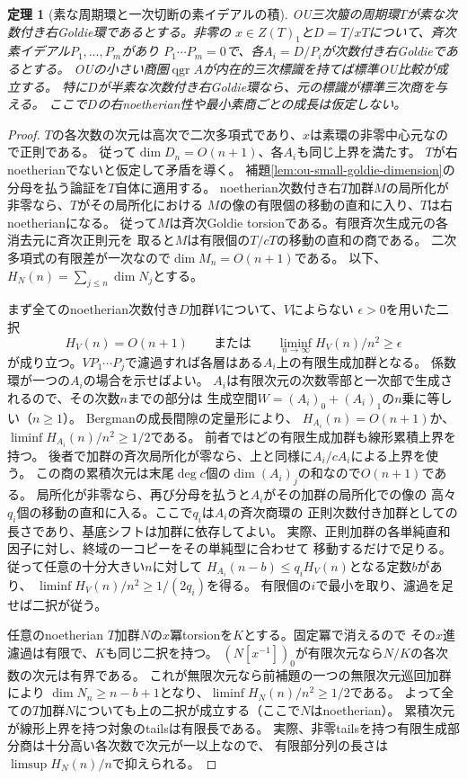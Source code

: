 \documentclass[11pt,a4paper]{ltjsarticle}
\newtheorem{theorem}{定理}[section]
\theoremstyle{definition}
\newcommand{\qgr}{\operatorname{qgr}}
\begin{document}
\begin{theorem}[素な周期環と一次切断の素イデアルの積]
\label{thm:ou-literal-filtered-window-cut}
OU三次箙の周期環$T$が素な次数付き右Goldie環であるとする。非零の
$x\in Z(T)_1$と$D=T/xT$について、斉次素イデアル$P_1,\ldots,P_m$があり
$P_1\cdots P_m=0$で、各$A_i=D/P_i$が次数付き右Goldieであるとする。
OUの小さい商圏$\qgr A$が内在的三次標識を持てば標準OU比較が成立する。
特に$D$が半素な次数付き右Goldie環なら、元の標識が標準三次商を与える。
ここで$D$の右noetherian性や最小素商ごとの成長は仮定しない。
\end{theorem}
\begin{proof}
$T$の各次数の次元は高次で二次多項式であり、$x$は素環の非零中心元なので正則である。
従って$\dim D_n=O(n+1)$、各$A_i$も同じ上界を満たす。
$T$が右noetherianでないと仮定して矛盾を導く。
補題\ref{lem:ou-small-goldie-dimension}の分母を払う論証を$T$自体に適用する。
noetherian次数付き右$T$加群$M$の局所化が非零なら、$T$がその局所化における
$M$の像の有限個の移動の直和に入り、$T$は右noetherianになる。
従って$M$は斉次Goldie torsionである。有限斉次生成元の各消去元に斉次正則元を
取ると$M$は有限個の$T/cT$の移動の直和の商である。
二次多項式の有限差が一次なので$\dim M_n=O(n+1)$である。
以下、$H_N(n)=\sum_{j\le n}\dim N_j$とする。

まず全てのnoetherian次数付き$D$加群$V$について、$V$によらない
$\epsilon>0$を用いた二択
\[
 H_V(n)=O(n+1)\qquad\text{または}\qquad
 \liminf_{n\to\infty}H_V(n)/n^2\ge\epsilon
\]
が成り立つ。$VP_1\cdots P_j$で濾過すれば各層はある$A_i$上の有限生成加群となる。
係数環が一つの$A_i$の場合を示せばよい。
$A_i$は有限次元の次数零部と一次部で生成されるので、その次数$n$までの部分は
生成空間$W=(A_i)_0+(A_i)_1$の$n$乗に等しい（$n\ge1$）。
Bergmanの成長間隙の定量形\cite[p.~298]{KanelBelovMM2021}により、
$H_{A_i}(n)=O(n+1)$か、$\liminf H_{A_i}(n)/n^2\ge1/2$である。
前者ではどの有限生成加群も線形累積上界を持つ。
後者で加群の斉次局所化が零なら、上と同様に$A_i/cA_i$による上界を使う。
この商の累積次元は末尾$\deg c$個の$\dim(A_i)_j$の和なので$O(n+1)$である。
局所化が非零なら、再び分母を払うと$A_i$がその加群の局所化での像の
高々$q_i$個の移動の直和に入る。ここで$q_i$は$A_i$の斉次商環の
正則次数付き加群としての長さであり、基底シフトは加群に依存してよい。
実際、正則加群の各単純直和因子に対し、終域の一コピーをその単純型に合わせて
移動するだけで足りる。従って任意の十分大きい$n$に対して
$H_{A_i}(n-b)\le q_i H_V(n)$となる定数$b$があり、
$\liminf H_V(n)/n^2\ge1/(2q_i)$を得る。
有限個の$i$で最小を取り、濾過を足せば二択が従う。

任意のnoetherian $T$加群$N$の$x$冪torsionを$K$とする。固定冪で消えるので
その$x$進濾過は有限で、$K$も同じ二択を持つ。
$(N[x^{-1}])_0$が有限次元なら$N/K$の各次数の次元は有界である。
これが無限次元なら前補題の一つの無限次元巡回加群により
$\dim N_n\ge n-b+1$となり、$\liminf H_N(n)/n^2\ge1/2$である。
よって全ての$T$加群$N$についても上の二択が成立する（ここで$N$はnoetherian）。
累積次元が線形上界を持つ対象のtailsは有限長である。
実際、非零tailsを持つ有限生成部分商は十分高い各次数で次元が一以上なので、
有限部分列の長さは$\limsup H_N(n)/n$で抑えられる。


\end{proof}
\end{document}
